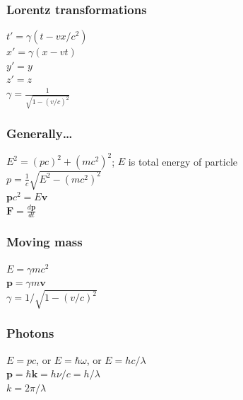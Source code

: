 \documentclass[letterpaper,landscape,10pt]{article}
\begin{document}
{\begin{multicols}{4}
  \subsubsection*{Lorentz transformations}
    \hspace{5pt}$t' = \gamma \left(t - vx/c^2\right)$ \\
    \hspace{5pt}$x' = \gamma \left(x - v t\right)$ \\
    \hspace{5pt}$y' = y$ \\
    \hspace{5pt}$z' = z$ \\
    \hspace{5pt}$\gamma = \frac{1}{\sqrt{1 - \left({v}/{c}\right)^2}}$
  
  \subsubsection*{Generally\dots}
	\hspace{5pt}$E^2 = {\left( pc \right)^2 + \left(mc^2\right)^2}$; $E$ is total energy of particle \\
	\hspace{5pt}$p = \frac{1}{c}\sqrt{E^2 - \left(mc^2\right)^2}$ \\
	\hspace{5pt}$\bm{p}c^2 = E\bm{v}$ \\
	\hspace{5pt}$\bm{F}=\frac{d\bm{p}}{dt}$
  \subsubsection*{Moving mass}
	\hspace{5pt}$E=\gamma mc^2$ \\
	\hspace{5pt}$\bm{p}=\gamma m \bm{v}$ \\
	\hspace{5pt}$\gamma = 1/\sqrt{1-(v/c)^2}$ \\
  \subsubsection*{Photons}
	\hspace{5pt}$E = pc$, \hspace{5pt}or $E = \hbar \omega$, \hspace{5pt} or $E = hc/\lambda$ \\
	\hspace{5pt}$\bm{p} = \hbar \bm{k} = h\nu/c = h/\lambda$ \\
	\hspace{5pt}$k=2\pi/\lambda$ \\


\end{multicols}}
\end{document}

